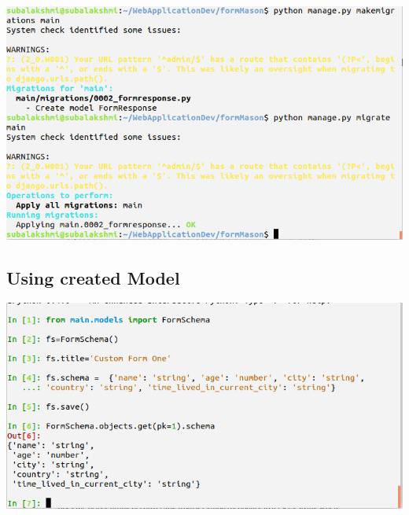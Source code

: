 \includegraphics[scale=0.55]{project/savingRespMigration.png}
\subsection{Using created Model}
\includegraphics[scale=0.45]{project/formSchemaDefn.png}
